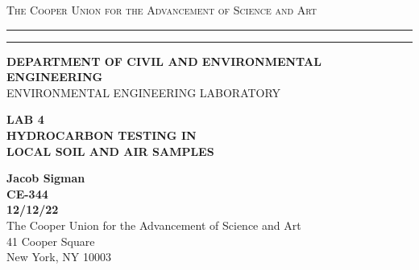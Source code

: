 \begin{titlepage}
    \begin{center}
    {{\Large{\textsc{The Cooper Union for the Advancement of Science and Art}}}} \rule[0.1cm]{15.8cm}{0.1mm}
    \rule[0.5cm]{15.8cm}{0.6mm}
    {\small{\bf DEPARTMENT OF CIVIL AND ENVIRONMENTAL ENGINEERING}}\\
    {\footnotesize{ENVIRONMENTAL ENGINEERING LABORATORY}}
    \end{center}
    \vspace{15mm}
    \begin{center}
    {\large{\bf LAB 4\\}}
    \vspace{5mm}
    {\Large{\bf HYDROCARBON TESTING IN\\}}
    \vspace{3mm}
    {\Large{\bf LOCAL SOIL AND AIR SAMPLES}}
    \end{center}
    \vspace{35mm}
    \par
    \noindent
    \hfill
    \vspace{60mm}
    \begin{center}
    {\large{\bf Jacob Sigman \\ CE-344 \\ 12/12/22 \\}}
    \vspace{20mm}
    {\normalsize{The Cooper Union for the Advancement of Science and Art \\ 41 Cooper Square\\
    New York, NY 10003}}
    \end{center}
\end{titlepage}